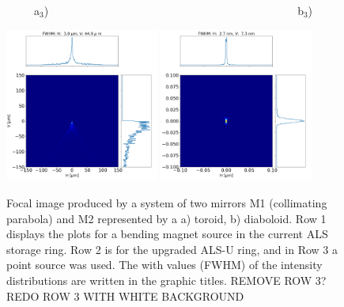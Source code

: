 \documentclass{iucr}              %
\newcommand{\inred}[1]{{\color{red}#1}}
\begin{document}
\begin{figure}
\flushleft
~~~~~a$_3$)~~~~~~~~~~~~~~~~~~~~~~~~~~~~~~~~~~~~~~~~~~~~~b$_3$) \\
\centering

\includegraphics[width=0.45\textwidth]{figures/bl_point_toroid.png} 
\includegraphics[width=0.45\textwidth]{figures/bl_point_diaboloid-exact.png}  \\
\caption{Focal image produced by a system of two mirrors M1 (collimating parabola) and M2 represented by a a) toroid, b) diaboloid. Row 1 displays the plots for a bending magnet source in the current ALS storage ring. Row 2 is for the upgraded ALS-U ring, and in Row 3 a point source was used. The with values (FWHM) of the intensity distributions are written in the graphic titles. \inred{REMOVE ROW 3? REDO ROW 3 WITH WHITE BACKGROUND}
}
\end{figure}
\end{document}
